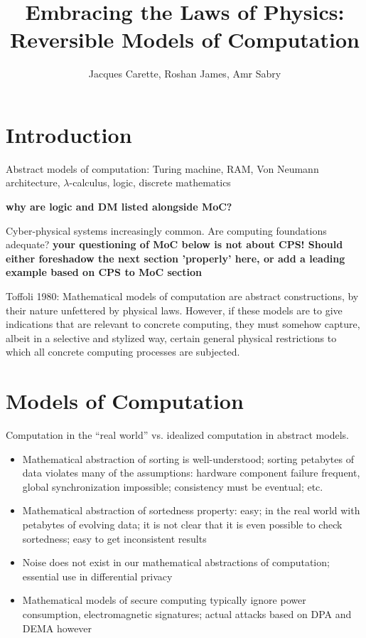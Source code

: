 \documentclass[12pt]{article}
\title{Embracing the Laws of Physics: \\ Reversible Models of Computation}
\author{Jacques Carette, Roshan James, Amr Sabry}
\newcommand{\jc}[1]{\fbox{Jacques says:} \textbf{#1}}
\begin{document}
\maketitle 

\section{Introduction}

Abstract models of computation: Turing machine, RAM, Von Neumann
architecture, $\lambda$-calculus, logic, discrete mathematics

\jc{why are logic and DM listed alongside MoC?}

Cyber-physical systems increasingly common. Are computing foundations
adequate? 
\jc{your questioning of MoC below is not about CPS! Should either
foreshadow the next section 'properly' here, or add a leading 
example based on CPS to MoC section}

Toffoli 1980: Mathematical models of computation are abstract
constructions, by their nature unfettered by physical laws. However,
if these models are to give indications that are relevant to concrete
computing, they must somehow capture, albeit in a selective and
stylized way, certain general physical restrictions to which all
concrete computing processes are subjected.

\section{Models of Computation}

Computation in the ``real world'' vs. idealized computation in
abstract models. 
\begin{itemize}
\item Mathematical abstraction of sorting is well-understood; sorting
  petabytes of data violates many of the assumptions: hardware
  component failure frequent, global synchronization impossible;
  consistency must be eventual; etc. 
\item Mathematical abstraction of sortedness property: easy; in the
  real world with petabytes of evolving data; it is not clear that it
  is even possible to check sortedness; easy to get inconsistent
  results
\item Noise does not exist in our mathematical abstractions of
  computation; essential use in differential privacy
\item Mathematical models of secure computing typically ignore power
  consumption, electromagnetic signatures; actual attacks based on DPA
  and DEMA however
\end{itemize}
\end{document}
